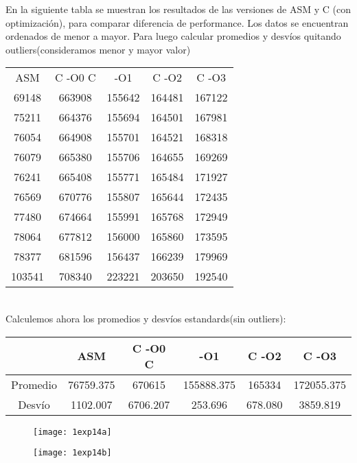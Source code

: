 ﻿\documentclass[a4paper]{article}
\begin{document}
En la siguiente tabla se muestran los resultados de las versiones de ASM y C (con optimización), para comparar diferencia de performance.
Los datos se encuentran ordenados de menor a mayor. Para luego calcular promedios y desvíos quitando outliers(consideramos menor y mayor valor)
\begin{center}
\begin{tabular}{| c | c | c | c | c | }
	ASM & C	-O0 C & -O1	& C -O2	& C -O3	\\                      
	69148	& 663908	& 155642	& 164481	& 167122 \\
	75211	& 664376	& 155694	& 164501	& 167981 \\
	76054	& 664908	& 155701	& 164521	& 168318 \\
	76079	& 665380	& 155706	& 164655	& 169269 \\
	76241	& 665408	& 155771	& 165484	& 171927 \\
	76569	& 670776	& 155807	& 165644	& 172435 \\
	77480	& 674664	& 155991	& 165768	& 172949 \\
	78064	& 677812	& 156000	& 165860	& 173595 \\
	78377	& 681596	& 156437	& 166239	& 179969 \\
	103541	& 708340	& 223221	& 203650	& 192540 \\

  
\end{tabular}
\end{center}
\ \\
Calculemos ahora los promedios y desvíos estandards(sin outliers):\\

\begin{tabular}{| c | c | c | c | c | c | }
      \hline
	& ASM & C	-O0 C & -O1	& C -O2	& C -O3	\\   
	\hline                   
	Promedio	&	76759.375	& 670615	& 155888.375	& 165334	& 172055.375 \\
	\hline
	Desvío	&	1102.007	& 6706.207	& 253.696	& 678.080	& 3859.819 \\
	\hline

  
\end{tabular}


\begin{figure}[h]
  \centering
    \texttt{[image: 1exp14a]}
\end{figure}

\begin{figure}[h]
  \centering
    \texttt{[image: 1exp14b]}
\end{figure}
\end{document}
